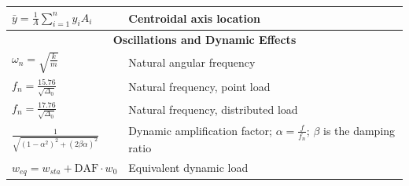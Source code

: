 \documentclass[twocolumn]{article}
\newcommand{\formulasection}[1]{\multicolumn{2}{c}{\textbf{#1}}}
\begin{document}
\begin{tabularx}{\linewidth}{l X}
    \(\bar{y} = \frac{1}{A}\sum_{i = 1}^n y_iA_i\) & Centroidal axis location \\
    \hline
    \formulasection{Oscillations and Dynamic Effects} \\
    \rule{0pt}{4ex}\(\omega_n = \sqrt{\frac{k}{m}}\) & Natural angular frequency \\
    \rule{0pt}{4ex}\(f_n = \frac{15.76}{\sqrt{\Delta_0}}\) & Natural frequency, point load \\
    \rule{0pt}{4ex}\(f_n = \frac{17.76}{\sqrt{\Delta_0}}\) & Natural frequency, distributed load \\
    \(\frac{1}{\sqrt{\left(1 - \alpha^2\right)^2 + \left(2\beta \alpha\right)^2}}\) & Dynamic amplification factor;
        \(\alpha = \frac{f}{f_n}\); \(\beta\) is the damping ratio \\
    \(w_{eq} = w_{sta} + \text{DAF} \cdot w_0\) & Equivalent dynamic load \\
\end{tabularx}
\end{document}
